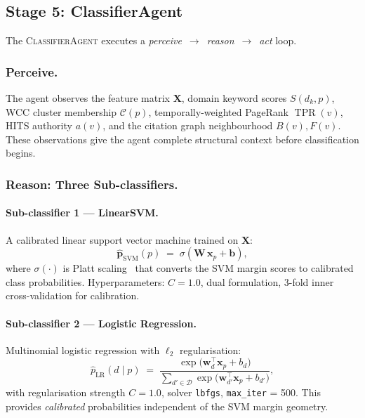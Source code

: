 \documentclass[letterpaper]{article}
\theoremstyle{plain}
\theoremstyle{definition}
\theoremstyle{remark}
\newcommand{\D}{\mathcal{D}}
\newcommand{\X}{\mathbf{X}}
\newcommand{\tpr}[1]{\operatorname{TPR}(#1)}
\newcommand{\auth}[1]{a(#1)}
\newcommand{\Bin}[1]{B(#1)}
\newcommand{\Fout}[1]{F(#1)}
\begin{document}
\subsection{Stage 5: ClassifierAgent}
\label{sec:agent}

The \textsc{ClassifierAgent} executes a
\emph{perceive}~$\to$~\emph{reason}~$\to$~\emph{act} loop.

\subsubsection{Perceive.}
The agent observes the feature matrix $\X$,
domain keyword scores $S(d_k, p)$,
WCC cluster membership $\mathcal{C}(p)$,
temporally-weighted PageRank $\tpr{v}$,
HITS authority $\auth{v}$,
and the citation graph neighbourhood
$\Bin{v}, \Fout{v}$.
These observations give the agent complete structural context
before classification begins.

\subsubsection{Reason: Three Sub-classifiers.}

\paragraph{Sub-classifier 1 --- LinearSVM.}
A calibrated linear support vector machine trained on $\X$:
\begin{equation}
    \hat{\mathbf{p}}_{\mathrm{SVM}}(p)
    \;=\;
    \sigma\!\left(\mathbf{W}\,\mathbf{x}_p + \mathbf{b}\right),
    \label{eq:svm}
\end{equation}
where $\sigma(\cdot)$ is Platt scaling~\cite{platt1999}
that converts the SVM margin scores to calibrated
class probabilities.
Hyperparameters: $C = 1.0$, dual formulation,
3-fold inner cross-validation for calibration.

\paragraph{Sub-classifier 2 --- Logistic Regression.}
Multinomial logistic regression with $\ell_2$ regularisation:
\begin{equation}
    \hat{p}_{\mathrm{LR}}(d \mid p)
    \;=\;
    \frac{\exp\!\bigl(\mathbf{w}_d^\top \mathbf{x}_p + b_d\bigr)}%
         {\displaystyle\sum_{d' \in \D}
          \exp\!\bigl(\mathbf{w}_{d'}^\top \mathbf{x}_p + b_{d'}\bigr)},
    \label{eq:lr}
\end{equation}
with regularisation strength $C = 1.0$,
solver \texttt{lbfgs}, \texttt{max\_iter} = 500.
This provides \emph{calibrated} probabilities
independent of the SVM margin geometry.
\end{document}
